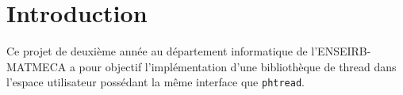 \section*{Introduction}

Ce projet de deuxième année au département informatique de l'ENSEIRB-MATMECA a pour objectif l'implémentation d'une bibliothèque de thread dans l'espace utilisateur possédant la même interface que \texttt{phtread}.

